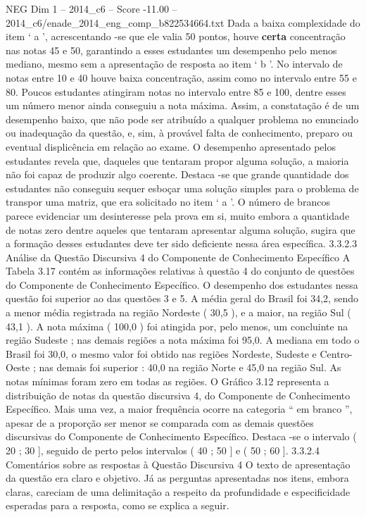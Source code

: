 \begin{textsample}{NEG Dim 1 – 2014\_c6 – Score -11.00 – 2014\_c6/enade\_2014\_eng\_comp\_b822534664.txt}
Dada a baixa complexidade do item ‘ a ’, acrescentando -se que ele valia 50 pontos, houve \textbf{certa} concentração nas notas 45 e 50, garantindo a esses estudantes um desempenho pelo menos mediano, mesmo sem a apresentação de resposta ao item ‘ b ’.
No intervalo de notas entre 10 e 40 houve baixa concentração, assim como no intervalo entre 55 e 80.
Poucos estudantes atingiram notas no intervalo entre 85 e 100, dentre esses um número menor ainda conseguiu a nota máxima.
Assim, a constatação é de um desempenho baixo, que não pode ser atribuído a qualquer problema no enunciado ou inadequação da questão, e, sim, à provável falta de conhecimento, preparo ou eventual displicência em relação ao exame.
O desempenho apresentado pelos estudantes revela que, daqueles que tentaram propor alguma solução, a maioria não foi capaz de produzir algo coerente.
Destaca -se que grande quantidade dos estudantes não conseguiu sequer esboçar uma solução simples para o problema de transpor uma matriz, que era solicitado no item ‘ a ’.
O número de brancos parece evidenciar um desinteresse pela prova em si, muito embora a quantidade de notas zero dentre aqueles que tentaram apresentar alguma solução, sugira que a formação desses estudantes deve ter sido deficiente nessa área específica. 3.3.2.3 Análise da Questão Discursiva 4 do Componente de Conhecimento Específico A Tabela 3.17 contém as informações relativas à questão 4 do conjunto de questões do Componente de Conhecimento Específico.
O desempenho dos estudantes nessa questão foi superior ao das questões 3 e 5.
A média geral do Brasil foi 34,2, sendo a menor média registrada na região Nordeste ( 30,5 ), e a maior, na região Sul ( 43,1 ).
A nota máxima ( 100,0 ) foi atingida por, pelo menos, um concluinte na região Sudeste ; nas demais regiões a nota máxima foi 95,0.
A mediana em todo o Brasil foi 30,0, o mesmo valor foi obtido nas regiões Nordeste, Sudeste e Centro-Oeste ; nas demais foi superior : 40,0 na região Norte e 45,0 na região Sul.
As notas mínimas foram zero em todas as regiões.
O Gráfico 3.12 representa a distribuição de notas da questão discursiva 4, do Componente de Conhecimento Específico.
Mais uma vez, a maior frequência ocorre na categoria “ em branco ”, apesar de a proporção ser menor se comparada com as demais questões discursivas do Componente de Conhecimento Específico.
Destaca -se o intervalo ( 20 ; 30 ], seguido de perto pelos intervalos ( 40 ; 50 ] e ( 50 ; 60 ]. 3.3.2.4 Comentários sobre as respostas à Questão Discursiva 4 O texto de apresentação da questão era claro e objetivo.
Já as perguntas apresentadas nos itens, embora claras, careciam de uma delimitação a respeito da profundidade e especificidade esperadas para a resposta, como se explica a seguir.

\end{textsample}
